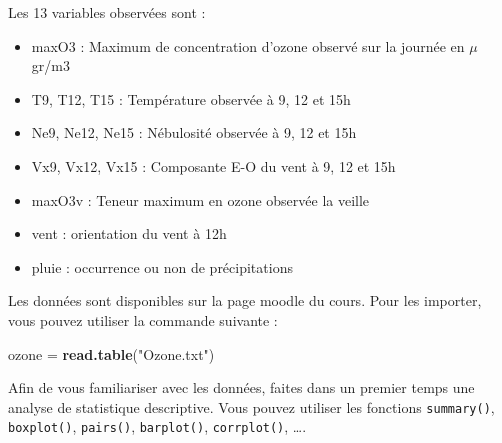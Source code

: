 \documentclass[
]{article}
\newenvironment{Shaded}{\begin{snugshade}}{\end{snugshade}}
\newcommand{\CommentTok}[1]{\textcolor[rgb]{0.56,0.35,0.01}{\textit{#1}}}
\newcommand{\FunctionTok}[1]{\textcolor[rgb]{0.13,0.29,0.53}{\textbf{#1}}}
\newcommand{\NormalTok}[1]{#1}
\newcommand{\OtherTok}[1]{\textcolor[rgb]{0.56,0.35,0.01}{#1}}
\newcommand{\SpecialCharTok}[1]{\textcolor[rgb]{0.81,0.36,0.00}{\textbf{#1}}}
\newcommand{\StringTok}[1]{\textcolor[rgb]{0.31,0.60,0.02}{#1}}
\providecommand{\tightlist}{%
  \setlength{\itemsep}{0pt}\setlength{\parskip}{0pt}}
\begin{document}
Les 13 variables observées sont :

\begin{itemize}
\tightlist
\item
  maxO3 : Maximum de concentration d'ozone observé sur la journée en
  \(\mu\)gr/m3
\item
  T9, T12, T15 : Température observée à 9, 12 et 15h
\item
  Ne9, Ne12, Ne15 : Nébulosité observée à 9, 12 et 15h
\item
  Vx9, Vx12, Vx15 : Composante E-O du vent à 9, 12 et 15h
\item
  maxO3v : Teneur maximum en ozone observée la veille
\item
  vent : orientation du vent à 12h
\item
  pluie : occurrence ou non de précipitations
\end{itemize}

Les données sont disponibles sur la page moodle du cours. Pour les
importer, vous pouvez utiliser la commande suivante :

\begin{Shaded}
\begin{Highlighting}[]
\NormalTok{ozone }\OtherTok{=} \FunctionTok{read.table}\NormalTok{(}\StringTok{"Ozone.txt"}\NormalTok{)}
\end{Highlighting}
\end{Shaded}

Afin de vous familiariser avec les données, faites dans un premier temps
une analyse de statistique descriptive. Vous pouvez utiliser les
fonctions \texttt{summary()}, \texttt{boxplot()}, \texttt{pairs()},
\texttt{barplot()}, \texttt{corrplot()}, \ldots.

\begin{Shaded}
\end{Shaded}
\end{document}
